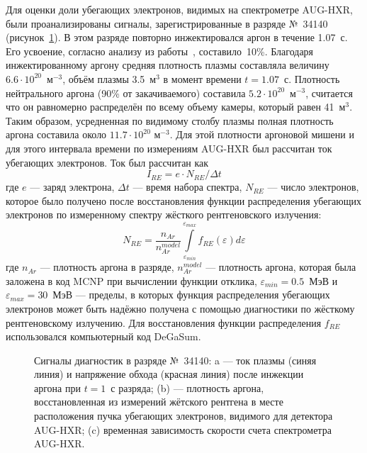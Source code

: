 Для оценки доли убегающих электронов, видимых на спектрометре AUG-HXR, были проанализированы сигналы, зарегистрированные в разряде №~34140 (рисунок~\ref{fig:asdexPlasmaParamsPulse34140}). В этом разряде повторно инжектировался аргон в течение 1.07~с. Его усвоение, согласно анализу из работы~\cite{Pautasso2020}, составило~10\%. Благодаря инжектированному аргону средняя плотность плазмы составляла величину $6.6\cdot 10^{20}$~м${}^{-3}$, объём плазмы 3.5~м${}^3$ в момент времени $t = 1.07$~с. Плотность нейтрального аргона (90\% от закачиваемого) составила $5.2\cdot 10^{20}$~м${}^{-3}$, считается что он равномерно распределён по всему объему камеры, который равен 41~м${}^3$. Таким образом, усредненная по видимому столбу плазмы полная плотность аргона составила около $11.7 \cdot 10^{20}$ м${}^{-3}$. Для этой плотности аргоновой мишени и для этого интервала времени по измерениям AUG-HXR был рассчитан ток убегающих электронов. Ток был рассчитан как 
\begin{equation*}
  I_{RE} = e \cdot N_{RE} / \Delta t
\end{equation*}
где $e$ --- заряд электрона, $\Delta t$ --- время набора спектра, $N_{RE}$ --- число электронов, которое было получено после восстановления функции распределения убегающих электронов по измеренному спектру жёсткого рентгеновского излучения:
\begin{equation*}
  N_{RE} = \frac{ n_{Ar} }{ n_{Ar}^{model} } \int \limits_{\varepsilon_{min}}^{\varepsilon_{max}} f_{RE}( \varepsilon ) d\varepsilon
\end{equation*}
где $n_{Ar}$ --- плотность аргона в разряде, $n_{Ar}^{model}$ --- плотность аргона, которая была заложена в код MCNP при вычислении функции отклика, $ \varepsilon_{min} = 0.5$~МэВ и $ \varepsilon_{max} = 30$~МэВ --- пределы, в которых функция распределения убегающих электронов может быть надёжно получена с помощью диагностики по жёсткому рентгеновскому излучению. Для восстановления функции распределения $f_{RE}$ использовался компьютерный код DeGaSum.~\cite{Shevelev2021}
 
\begin{figure}[ht!]
  \caption{ Сигналы диагностик в разряде №~34140: a --- ток плазмы (синяя линия) и напряжение обхода (красная линия) после инжекции аргона при $t = 1$~с разряда; (b) --- плотность аргона, восстановленная из измерений жётского рентгена в месте расположения пучка убегающих электронов, видимого для детектора AUG-HXR; (c) временная зависимость скорости счета спектрометра AUG-HXR.~\cite{Shevelev2021} }
  \label{fig:asdexPlasmaParamsPulse34140}
\end{figure}

